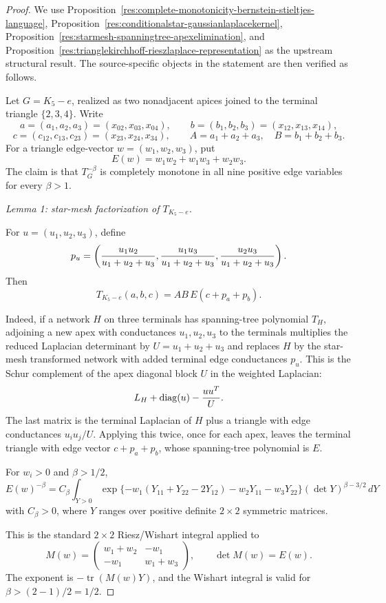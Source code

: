 \documentclass[11pt]{article}
\numberwithin{equation}{section}
\theoremstyle{definition}
\theoremstyle{remark}
\newcommand{\1}{\mathbf 1}
\begin{document}
\begin{proof}
We use Proposition~\ref{res:complete-monotonicity-bernstein-stieltjes-language}, Proposition~\ref{res:conditionalstar-gaussianlaplacekernel}, Proposition~\ref{res:starmesh-spanningtree-apexelimination}, and Proposition~\ref{res:trianglekirchhoff-rieszlaplace-representation} as the upstream structural result. The source-specific objects in the statement are then verified as follows.

Let \(G=K_5-e\), realized as two nonadjacent apices joined to the terminal triangle \(\{2,3,4\}\). Write
\[
a=(a_1,a_2,a_3)=(x_{02},x_{03},x_{04}),\qquad
b=(b_1,b_2,b_3)=(x_{12},x_{13},x_{14}),
\]
\[
c=(c_{12},c_{13},c_{23})=(x_{23},x_{24},x_{34}),
\qquad A=a_1+a_2+a_3,\quad B=b_1+b_2+b_3 .
\]
For a triangle edge-vector \(w=(w_1,w_2,w_3)\), put
\[
E(w)=w_1w_2+w_1w_3+w_2w_3 .
\]
The claim is that \(T_G^{-\beta}\) is completely monotone in all nine positive edge variables for every \(\beta>1\).

\emph{Lemma 1: star-mesh factorization of \(T_{K_5-e}\).}

For \(u=(u_1,u_2,u_3)\), define
\[
p_u=\left({u_1u_2\over u_1+u_2+u_3},
          {u_1u_3\over u_1+u_2+u_3},
          {u_2u_3\over u_1+u_2+u_3}\right).
\]
Then
\[
T_{K_5-e}(a,b,c)=AB\,E(c+p_a+p_b).
\]

Indeed, if a network \(H\) on three terminals has spanning-tree polynomial \(T_H\), adjoining a new apex with conductances \(u_1,u_2,u_3\) to the terminals multiplies the reduced Laplacian determinant by \(U=u_1+u_2+u_3\) and replaces \(H\) by the star-mesh transformed network with added terminal edge conductances \(p_u\). This is the Schur complement of the apex diagonal block \(U\) in the weighted Laplacian:
\[
L_H+\operatorname{diag}(u)-{uu^T\over U}.
\]
The last matrix is the terminal Laplacian of \(H\) plus a triangle with edge conductances \(u_iu_j/U\). Applying this twice, once for each apex, leaves the terminal triangle with edge vector \(c+p_a+p_b\), whose spanning-tree polynomial is \(E\).

For \(w_i>0\) and \(\beta>1/2\),
\[
E(w)^{-\beta}
=C_\beta\int_{Y>0}
\exp\{-w_1(Y_{11}+Y_{22}-2Y_{12})-w_2Y_{11}-w_3Y_{22}\}
(\det Y)^{\beta-3/2}\,dY
\]
with \(C_\beta>0\), where \(Y\) ranges over positive definite \(2\times2\) symmetric matrices.

This is the standard \(2\times2\) Riesz/Wishart integral applied to
\[
M(w)=
\begin{pmatrix}
w_1+w_2 & -w_1\\
-w_1 & w_1+w_3
\end{pmatrix},
\qquad \det M(w)=E(w).
\]
The exponent is \(-\operatorname{tr}(M(w)Y)\), and the Wishart integral is valid for \(\beta>(2-1)/2=1/2\).


\end{proof}
\end{document}
